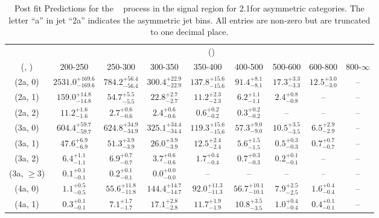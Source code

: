 \begin{table}[h!]
\tiny
\centering
\caption{Post fit Predictions for the \zInv~ process in the signal region for 2.1\ifb for asymmetric categories. The letter ``a'' in jet \eg ``2a''  indicates the asymmetric jet bins. All entries are non-zero but are truncated to one decimal place.\label{tab:predseppost_sig_zinv_asym}}
\begin{tabular}
{ccccccccc}
	\hline\hline
	& \multicolumn{8}{c}{\scalht (\gev)} \\ 
	 (\njet,  \nb) & 200-250 & 250-300 & 300-350 & 350-400 & 400-500 & 500-600 & 600-800 & 800-$\infty$ \\ [0.8ex] 
\hline
	(2a, 0) & $2531.0^{+ 169.6 }_{- 169.6 }$ & $784.2^{+ 56.4 }_{- 56.4 }$ & $300.4^{+ 22.9 }_{- 22.9 }$ & $137.8^{+ 15.6 }_{- 15.6 }$ & $91.4^{+ 8.1 }_{- 8.1 }$ & $17.3^{+ 3.3 }_{- 3.3 }$ & $12.5^{+ 3.0 }_{- 3.0 }$ & -- \\[0.5ex] 
	(2a, 1) & $159.0^{+ 14.8 }_{- 14.8 }$ & $54.7^{+ 5.5 }_{- 5.5 }$ & $22.8^{+ 2.7 }_{- 2.7 }$ & $11.2^{+ 2.3 }_{- 2.3 }$ & $6.2^{+ 1.1 }_{- 1.1 }$ & $2.4^{+ 0.8 }_{- 0.8 }$ & -- & -- \\[0.5ex] 
	(2a, 2) & $11.2^{+ 1.6 }_{- 1.6 }$ & $2.7^{+ 0.6 }_{- 0.6 }$ & $2.4^{+ 0.6 }_{- 0.6 }$ & $0.6^{+ 0.2 }_{- 0.2 }$ & $0.3^{+ 0.2 }_{- 0.2 }$ & -- & -- & -- \\[0.5ex] 
	(3a, 0) & $604.4^{+ 59.7 }_{- 59.7 }$ & $624.8^{+ 34.9 }_{- 34.9 }$ & $325.1^{+ 34.4 }_{- 34.4 }$ & $119.3^{+ 15.6 }_{- 15.6 }$ & $57.3^{+ 9.0 }_{- 9.0 }$ & $10.5^{+ 3.5 }_{- 3.5 }$ & $6.5^{+ 2.9 }_{- 2.9 }$ & -- \\[0.5ex] 
	(3a, 1) & $47.6^{+ 6.9 }_{- 6.9 }$ & $51.3^{+ 3.9 }_{- 3.9 }$ & $26.0^{+ 3.9 }_{- 3.9 }$ & $12.5^{+ 2.4 }_{- 2.4 }$ & $5.6^{+ 1.5 }_{- 1.5 }$ & $0.5^{+ 0.3 }_{- 0.3 }$ & $0.7^{+ 0.7 }_{- 0.7 }$ & -- \\[0.5ex] 
	(3a, 2) & $6.4^{+ 1.1 }_{- 1.1 }$ & $6.9^{+ 0.7 }_{- 0.7 }$ & $3.7^{+ 0.6 }_{- 0.6 }$ & $1.7^{+ 0.4 }_{- 0.4 }$ & $0.7^{+ 0.3 }_{- 0.3 }$ & $0.2^{+ 0.1 }_{- 0.1 }$ & -- & -- \\[0.5ex] 
	(3a, $\ge3$) & $0.1^{+ 0.1 }_{- 0.1 }$ & $0.2^{+ 0.1 }_{- 0.1 }$ & $0.0^{+ 0.0 }_{- 0.0 }$ & -- & -- & -- & -- & -- \\[0.5ex] 
	(4a, 0) & $1.1^{+ 0.5 }_{- 0.5 }$ & $55.6^{+ 11.8 }_{- 11.8 }$ & $144.4^{+ 14.7 }_{- 14.7 }$ & $92.0^{+ 11.3 }_{- 11.3 }$ & $56.7^{+ 10.1 }_{- 10.1 }$ & $7.9^{+ 2.5 }_{- 2.5 }$ & $1.6^{+ 0.4 }_{- 0.4 }$ & -- \\[0.5ex] 
	(4a, 1) & $0.3^{+ 0.1 }_{- 0.1 }$ & $7.1^{+ 1.7 }_{- 1.7 }$ & $17.1^{+ 2.8 }_{- 2.8 }$ & $11.7^{+ 1.9 }_{- 1.9 }$ & $10.8^{+ 3.5 }_{- 3.5 }$ & $1.0^{+ 0.4 }_{- 0.4 }$ & $0.4^{+ 0.1 }_{- 0.1 }$ & -- \\[0.5ex] 

\end{tabular}
\end{table}

